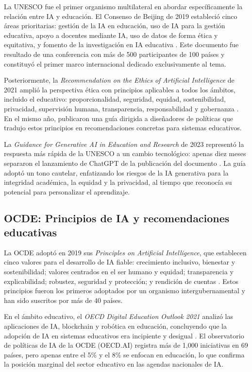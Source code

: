 La UNESCO fue el primer organismo multilateral en abordar específicamente la relación entre IA y educación. El Consenso de Beijing de 2019 estableció cinco áreas prioritarias: gestión de la IA en educación, uso de IA para la gestión educativa, apoyo a docentes mediante IA, uso de datos de forma ética y equitativa, y fomento de la investigación en IA educativa \citep{unesco2019beijing}. Este documento fue resultado de una conferencia con más de 500 participantes de 100 países y constituyó el primer marco internacional dedicado exclusivamente al tema.

Posteriormente, la \textit{Recommendation on the Ethics of Artificial Intelligence} de 2021 amplió la perspectiva ética con principios aplicables a todos los ámbitos, incluido el educativo: proporcionalidad, seguridad, equidad, sostenibilidad, privacidad, supervisión humana, transparencia, responsabilidad y gobernanza \citep{unesco2021ai}. En el mismo año, \citet{miao2021guidance} publicaron una guía dirigida a diseñadores de políticas que tradujo estos principios en recomendaciones concretas para sistemas educativos.

La \textit{Guidance for Generative AI in Education and Research} de 2023 representó la respuesta más rápida de la UNESCO a un cambio tecnológico: apenas diez meses separaron el lanzamiento de ChatGPT de la publicación del documento \citep{unesco2023genai}. La guía adoptó un tono cautelar, enfatizando los riesgos de la IA generativa para la integridad académica, la equidad y la privacidad, al tiempo que reconocía su potencial para personalizar el aprendizaje.


\subsection{OCDE: Principios de IA y recomendaciones educativas}

La OCDE adoptó en 2019 sus \textit{Principles on Artificial Intelligence}, que establecen cinco valores para el desarrollo de IA fiable: crecimiento inclusivo, bienestar y sostenibilidad; valores centrados en el ser humano y equidad; transparencia y explicabilidad; robustez, seguridad y protección; y rendición de cuentas \citep{oecd2019ai}. Estos principios fueron los primeros adoptados por un organismo intergubernamental y han sido suscritos por más de 40 países.

En el ámbito educativo, el \textit{OECD Digital Education Outlook 2021} analizó las aplicaciones de IA, blockchain y robótica en educación, concluyendo que la adopción de IA en sistemas educativos era incipiente y desigual \citep{oecd2021digitaloutlook}. El observatorio de políticas de IA de la OCDE (OECD.AI) registra más de 1{,}000 iniciativas en 69 países, pero apenas entre el 5\% y el 8\% se enfocan en educación, lo que confirma la posición marginal del sector educativo en las agendas nacionales de IA.

